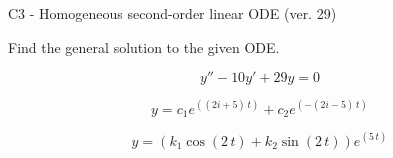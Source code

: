 \begin{exercise}
  \begin{exerciseTitle}C3 - Homogeneous second-order linear ODE (ver. 29)\end{exerciseTitle}
  \begin{exerciseStatement}
    
Find the general solution to the given ODE.

    
\[y''-10y'+29y = 0\]

  \end{exerciseStatement}
  \begin{exerciseAnswer}
    
\[y= c_{1} e^{\left(\left(2 i + 5\right) \, t\right)} + c_{2} e^{\left(-\left(2 i - 5\right) \, t\right)}\]

    
\[y= {\left(k_{1} \cos\left(2 \, t\right) + k_{2} \sin\left(2 \, t\right)\right)} e^{\left(5 \, t\right)}\]

  \end{exerciseAnswer}
\end{exercise}